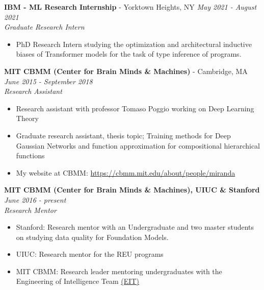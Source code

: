 \documentclass{article}
\newenvironment{changemargin}[2]{%
  \begin{list}{}{%
    \setlength{\topsep}{0pt}%
    \setlength{\leftmargin}{#1}%
    \setlength{\rightmargin}{#2}%
    \setlength{\listparindent}{\parindent}%
    \setlength{\itemindent}{\parindent}%
    \setlength{\parsep}{\parskip}%
  }%
  \item[]}{\end{list}
}
\newenvironment{body} {
	\vspace*{-16pt}
	\begin{changemargin}{-0.25in}{-0.5in}
  }	
	{\end{changemargin}
}
\begin{document}
\begin{body}
	\textbf{IBM - ML Research Internship} - Yorktown Heights, NY \hfill \emph{May 2021 - August 2021}\\
	\emph{Graduate Research Intern}\\
	\vspace*{-3pt}
	\begin{itemize} \itemsep -2pt  %
		\item PhD Research Intern studying the optimization and architectural inductive biases of Transformer models for the task of type inference of programs. 
	\end{itemize}
	\vspace{5 pt}

	\textbf{MIT CBMM (Center for Brain Minds \& Machines)} - Cambridge, MA \hfill \emph{June 2015 - September 2018}\\
	\emph{Research Assistant}\\
	\vspace*{-3pt}
	\begin{itemize} \itemsep -2pt  %
        \item Research assistant with professor Tomaso Poggio working on Deep Learning Theory
        \item Graduate research assistant, thesis topic; Training methods for Deep Gaussian Networks and function approximation for compositional hierarchical functions
        \item My website at CBMM: \href{https://cbmm.mit.edu/about/people/miranda}{https://cbmm.mit.edu/about/people/miranda}
	\end{itemize}
	\vspace{5 pt}
    
	\textbf{MIT CBMM (Center for Brain Minds \& Machines), UIUC \& Stanford} \hfill \emph{June 2016 - present}\\
	\emph{Research Mentor}\\
	\vspace*{-3pt}
	\begin{itemize} \itemsep -2pt  %
        \item Stanford: Research mentor with an Undergraduate and two master students on studying data quality for Foundation Models.
        \item UIUC: Research mentor for the REU programs
        \item MIT CBMM: Research leader mentoring undergraduates with the Engineering of Intelligence Team \href{https://cbmm.mit.edu/eit/people}{(EIT)}
	\end{itemize}
	\vspace{5 pt}
    

\end{body}
\end{document}
